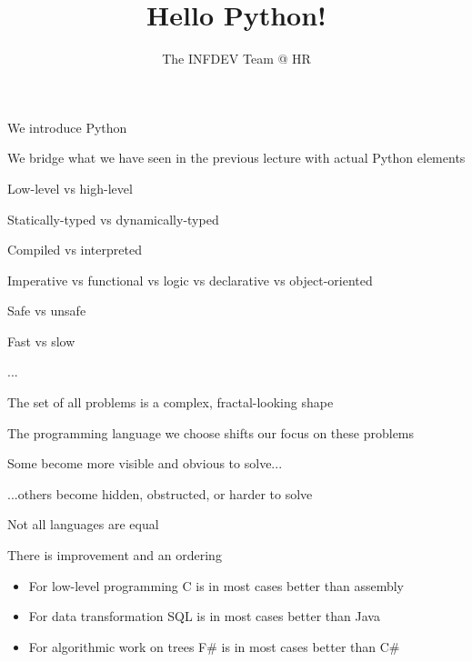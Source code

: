 \documentclass{beamer}
\title{Hello Python!}
\author{The INFDEV Team @ HR}
\institute{Hogeschool Rotterdam \\ 
Rotterdam, Netherlands}
\date{}
\begin{document}
\maketitle

\begin{slide}{
\item We introduce Python
\item We bridge what we have seen in the previous lecture with actual Python elements
}\end{slide}

\begin{slide}{
\item Low-level vs high-level
\item Statically-typed vs dynamically-typed
\item Compiled vs interpreted
\item Imperative vs functional vs logic vs declarative vs object-oriented
\item Safe vs unsafe
\item Fast vs slow
\item ...
}\end{slide}

\begin{slide}{
\item The set of all problems is a complex, fractal-looking shape
\item The programming language we choose shifts our focus on these problems
\item Some become more visible and obvious to solve...
\pause
\item ...others become hidden, obstructed, or harder to solve
}\end{slide}

\begin{slide}{
\item Not all languages are equal
\item There is improvement and an ordering
\begin{itemize}
\item For low-level programming C is in most cases better than assembly
\item For data transformation SQL is in most cases better than Java
\item For algorithmic work on trees F\# is in most cases better than C\#
\end{itemize}
}\end{slide}
\end{document}
